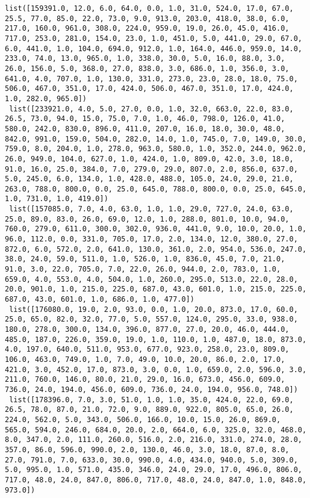 \documentclass[11pt]{article}
\begin{document}
\begin{Verbatim}[commandchars=\\\{\}]
 list([159391.0, 12.0, 6.0, 64.0, 0.0, 1.0, 31.0, 524.0, 17.0, 67.0, 25.5, 77.0, 85.0, 22.0, 73.0, 9.0, 913.0, 203.0, 418.0, 38.0, 6.0, 217.0, 160.0, 961.0, 308.0, 224.0, 959.0, 19.0, 26.0, 45.0, 416.0, 717.0, 253.0, 281.0, 154.0, 23.0, 1.0, 451.0, 5.0, 441.0, 29.0, 67.0, 6.0, 441.0, 1.0, 104.0, 694.0, 912.0, 1.0, 164.0, 446.0, 959.0, 14.0, 233.0, 74.0, 13.0, 965.0, 1.0, 338.0, 30.0, 5.0, 16.0, 88.0, 3.0, 26.0, 156.0, 5.0, 368.0, 27.0, 838.0, 3.0, 686.0, 1.0, 356.0, 3.0, 641.0, 4.0, 707.0, 1.0, 130.0, 331.0, 273.0, 23.0, 28.0, 18.0, 75.0, 506.0, 467.0, 351.0, 17.0, 424.0, 506.0, 467.0, 351.0, 17.0, 424.0, 1.0, 282.0, 965.0])
 list([233921.0, 4.0, 5.0, 27.0, 0.0, 1.0, 32.0, 663.0, 22.0, 83.0, 26.5, 73.0, 94.0, 15.0, 75.0, 7.0, 1.0, 46.0, 798.0, 126.0, 41.0, 580.0, 242.0, 830.0, 896.0, 411.0, 207.0, 16.0, 18.0, 30.0, 48.0, 842.0, 991.0, 159.0, 504.0, 282.0, 14.0, 1.0, 745.0, 7.0, 149.0, 30.0, 759.0, 8.0, 204.0, 1.0, 278.0, 963.0, 580.0, 1.0, 352.0, 244.0, 962.0, 26.0, 949.0, 104.0, 627.0, 1.0, 424.0, 1.0, 809.0, 42.0, 3.0, 18.0, 91.0, 16.0, 25.0, 384.0, 7.0, 279.0, 29.0, 807.0, 2.0, 856.0, 637.0, 5.0, 245.0, 6.0, 134.0, 1.0, 428.0, 488.0, 105.0, 24.0, 29.0, 21.0, 263.0, 788.0, 800.0, 0.0, 25.0, 645.0, 788.0, 800.0, 0.0, 25.0, 645.0, 1.0, 731.0, 1.0, 419.0])
 list([157085.0, 7.0, 4.0, 63.0, 1.0, 1.0, 29.0, 727.0, 24.0, 63.0, 25.0, 89.0, 83.0, 26.0, 69.0, 12.0, 1.0, 288.0, 801.0, 10.0, 94.0, 760.0, 279.0, 611.0, 300.0, 302.0, 936.0, 441.0, 9.0, 10.0, 20.0, 1.0, 96.0, 112.0, 0.0, 331.0, 705.0, 17.0, 2.0, 134.0, 12.0, 380.0, 27.0, 872.0, 6.0, 572.0, 2.0, 641.0, 130.0, 361.0, 2.0, 954.0, 536.0, 247.0, 38.0, 24.0, 59.0, 511.0, 1.0, 526.0, 1.0, 836.0, 45.0, 7.0, 21.0, 91.0, 3.0, 22.0, 705.0, 7.0, 22.0, 26.0, 944.0, 2.0, 783.0, 1.0, 659.0, 4.0, 553.0, 4.0, 504.0, 1.0, 260.0, 295.0, 513.0, 22.0, 28.0, 20.0, 901.0, 1.0, 215.0, 225.0, 687.0, 43.0, 601.0, 1.0, 215.0, 225.0, 687.0, 43.0, 601.0, 1.0, 686.0, 1.0, 477.0])
 list([176080.0, 19.0, 2.0, 93.0, 0.0, 1.0, 20.0, 873.0, 17.0, 60.0, 25.0, 65.0, 82.0, 32.0, 77.0, 5.0, 557.0, 124.0, 295.0, 33.0, 938.0, 180.0, 278.0, 300.0, 134.0, 396.0, 877.0, 27.0, 20.0, 46.0, 444.0, 485.0, 187.0, 226.0, 359.0, 19.0, 1.0, 110.0, 1.0, 487.0, 18.0, 873.0, 4.0, 197.0, 640.0, 511.0, 953.0, 677.0, 923.0, 258.0, 23.0, 809.0, 106.0, 463.0, 749.0, 1.0, 7.0, 49.0, 10.0, 20.0, 86.0, 2.0, 17.0, 421.0, 3.0, 452.0, 17.0, 873.0, 3.0, 0.0, 1.0, 659.0, 2.0, 596.0, 3.0, 211.0, 760.0, 146.0, 80.0, 21.0, 29.0, 16.0, 673.0, 456.0, 609.0, 736.0, 24.0, 194.0, 456.0, 609.0, 736.0, 24.0, 194.0, 956.0, 748.0])
 list([178396.0, 7.0, 3.0, 51.0, 1.0, 1.0, 35.0, 424.0, 22.0, 69.0, 26.5, 78.0, 87.0, 21.0, 72.0, 9.0, 889.0, 922.0, 805.0, 65.0, 26.0, 224.0, 562.0, 5.0, 343.0, 506.0, 166.0, 10.0, 15.0, 26.0, 869.0, 565.0, 594.0, 246.0, 684.0, 20.0, 2.0, 664.0, 6.0, 325.0, 32.0, 468.0, 8.0, 347.0, 2.0, 111.0, 260.0, 516.0, 2.0, 216.0, 331.0, 274.0, 28.0, 357.0, 86.0, 596.0, 990.0, 2.0, 130.0, 46.0, 3.0, 18.0, 87.0, 8.0, 27.0, 791.0, 7.0, 633.0, 30.0, 990.0, 4.0, 434.0, 940.0, 5.0, 309.0, 5.0, 995.0, 1.0, 571.0, 435.0, 346.0, 24.0, 29.0, 17.0, 496.0, 806.0, 717.0, 48.0, 24.0, 847.0, 806.0, 717.0, 48.0, 24.0, 847.0, 1.0, 848.0, 973.0])

\end{Verbatim}
\end{document}
